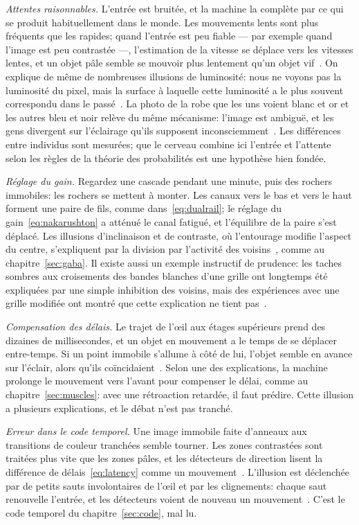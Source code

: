 \emph{Attentes raisonnables.} L'entrée est bruitée, et la machine la complète par ce qui se produit habituellement dans le monde. Les mouvements lents sont plus fréquents que les rapides; quand l'entrée est peu fiable --- par exemple quand l'image est peu contrastée ---, l'estimation de la vitesse se déplace vers les vitesses lentes, et un objet pâle semble se mouvoir plus lentement qu'un objet vif~\cite{Weiss2002}. On explique de même de nombreuses illusions de luminosité: nous ne voyons pas la luminosité du pixel, mais la surface à laquelle cette luminosité a le plus souvent correspondu dans le passé~\cite{Purves2011}. La photo de la robe que les uns voient blanc et or et les autres bleu et noir relève du même mécanisme: l'image est ambiguë, et les gens divergent sur l'éclairage qu'ils supposent inconsciemment~\cite{LaferSousa2015,Wallisch2017}. Les différences entre individus sont mesurées; que le cerveau combine ici l'entrée et l'attente selon les règles de la théorie des probabilités est une hypothèse bien fondée.

\emph{Réglage du gain.} Regardez une cascade pendant une minute, puis des rochers immobiles: les rochers se mettent à monter. Les canaux \og vers le bas\fg{} et \og vers le haut\fg{} forment une paire de fils, comme dans~\eqref{eq:dualrail}; le réglage du gain~\eqref{eq:nakarushton} a atténué le canal fatigué, et l'équilibre de la paire s'est déplacé. Les illusions d'inclinaison et de contraste, où l'entourage modifie l'aspect du centre, s'expliquent par la division par l'activité des voisins~\cite{Schwartz2009}, comme au chapitre~\ref{sec:gaba}. Il existe aussi un exemple instructif de prudence: les taches sombres aux croisements des bandes blanches d'une grille ont longtemps été expliquées par une simple inhibition des voisins, mais des expériences avec une grille modifiée ont montré que cette explication ne tient pas~\cite{SchillerCarvey2005}.

\emph{Compensation des délais.} Le trajet de l'œil aux étages supérieurs prend des dizaines de millisecondes, et un objet en mouvement a le temps de se déplacer entre-temps. Si un point immobile s'allume à côté de lui, l'objet semble en avance sur l'éclair, alors qu'ils coïncidaient~\cite{Nijhawan1994}. Selon une des explications, la machine prolonge le mouvement vers l'avant pour compenser le délai, comme au chapitre~\ref{sec:muscles}: avec une rétroaction retardée, il faut prédire. Cette illusion a plusieurs explications, et le débat n'est pas tranché.

\emph{Erreur dans le code temporel.} Une image immobile faite d'anneaux aux transitions de couleur tranchées semble tourner. Les zones contrastées sont traitées plus vite que les zones pâles, et les détecteurs de direction lisent la différence de délais~\eqref{eq:latency} comme un mouvement~\cite{Conway2005}. L'illusion est déclenchée par de petits sauts involontaires de l'œil et par les clignements: chaque saut renouvelle l'entrée, et les détecteurs voient de nouveau un \og mouvement\fg{}~\cite{OteroMillan2012}. C'est le code temporel du chapitre~\ref{sec:code}, mal lu.

